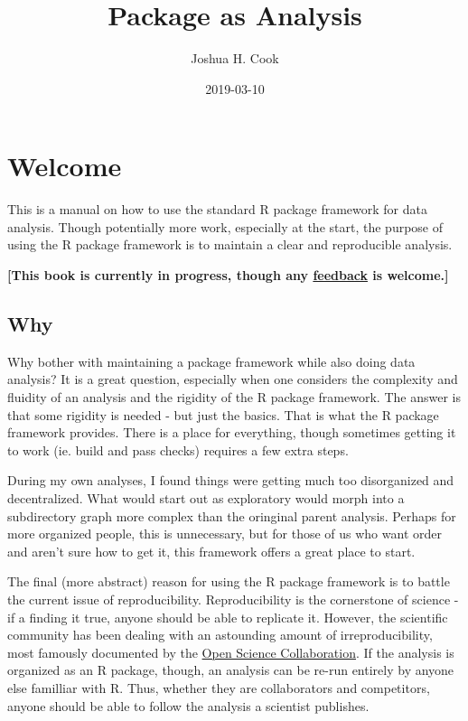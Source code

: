 \documentclass[]{book}
\title{Package as Analysis}
\author{Joshua H. Cook}
\date{2019-03-10}
\begin{document}
\maketitle

{
\setcounter{tocdepth}{1}
\tableofcontents
}
\chapter*{Welcome}\label{welcome}

This is a manual on how to use the standard R package framework for data
analysis. Though potentially more work, especially at the start, the
purpose of using the R package framework is to maintain a clear and
reproducible analysis.

\textbf{{[}This book is currently in progress, though any
\href{https://github.com/jhrcook/package-as-analysis/issues}{feedback}
is welcome.{]}}

\section*{Why}\label{why}

Why bother with maintaining a package framework while also doing data
analysis? It is a great question, especially when one considers the
complexity and fluidity of an analysis and the rigidity of the R package
framework. The answer is that some rigidity is needed - but just the
basics. That is what the R package framework provides. There is a place
for everything, though sometimes getting it to work (ie. build and pass
checks) requires a few extra steps.

During my own analyses, I found things were getting much too
disorganized and decentralized. What would start out as exploratory
would morph into a subdirectory graph more complex than the oringinal
parent analysis. Perhaps for more organized people, this is unnecessary,
but for those of us who want order and aren't sure how to get it, this
framework offers a great place to start.

The final (more abstract) reason for using the R package framework is to
battle the current issue of reproducibility. Reproducibility is the
cornerstone of science - if a finding it true, anyone should be able to
replicate it. However, the scientific community has been dealing with an
astounding amount of irreproducibility, most famously documented by the
\href{http://science.sciencemag.org/content/349/6251/aac4716}{Open
Science Collaboration}. If the analysis is organized as an R package,
though, an analysis can be re-run entirely by anyone else familliar with
R. Thus, whether they are collaborators and competitors, anyone should
be able to follow the analysis a scientist publishes.
\end{document}
